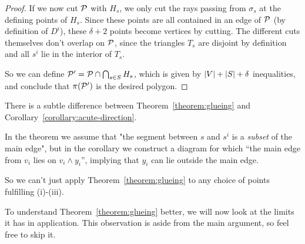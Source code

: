 \begin{proof}
  If we now cut $\P$ with $H_s$, we only cut the rays passing from $\sigma_s$ at the defining points of $H_s$. Since these points are all contained in an edge of $\P$ (by definition of $D^i$), these $\delta + 2$ points become vertices by cutting. The different cuts themselves don't overlap on $\P$, since the triangles $T_s$ are disjoint by definition and all $s^i$ lie in the interior of $T_s$.

  So we can define $\P' = \P \cap \bigcap_{s \in S} H_s$, which is given by $\abs{V}+\abs{S}+\delta$ inequalities, and conclude that $\pi(\P')$ is the desired polygon.
\end{proof}

\begin{remark}\label{remark:pitfall}
  There is a subtle difference between Theorem~\ref{theorem:glueing} and Corollary~\ref{corollary:acute-direction}.

  In the theorem we assume that "the segment between $s$ and $s^i$ is a \emph{subset} of the main edge", but in the corollary we construct a diagram for which ``the main edge from $v_i$ lies on $v_i \wedge y_i$'', implying that $y_i$ can lie outside the main edge. 

  So we can't just apply Theorem~\ref{theorem:glueing} to any choice of points fulfilling (i)-(iii).
\end{remark}

To understand Theorem~\ref{theorem:glueing} better, we will now look at the limits it has in application. This observation is aside from the main argument, so feel free to skip it.

